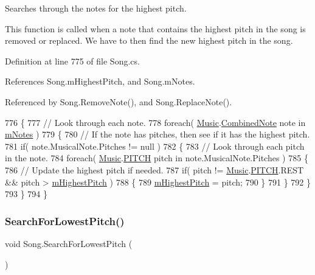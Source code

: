 Searches through the notes for the highest pitch. 

This function is called when a note that contains the highest pitch in the song is removed or replaced. We have to then find the new highest pitch in the song. 

Definition at line 775 of file Song.\+cs.



References Song.\+m\+Highest\+Pitch, and Song.\+m\+Notes.



Referenced by Song.\+Remove\+Note(), and Song.\+Replace\+Note().


\begin{DoxyCode}
776     \{
777         \textcolor{comment}{// Look through each note.}
778         \textcolor{keywordflow}{foreach}( \hyperlink{class_music}{Music}.\hyperlink{group___music_structs_struct_music_1_1_combined_note}{CombinedNote} note in \hyperlink{group___song_priv_var_ga674bc904a1f856d485d5fb7fe84bac85}{mNotes} )
779         \{
780             \textcolor{comment}{// If the note has pitches, then see if it has the highest pitch.}
781             \textcolor{keywordflow}{if}( note.MusicalNote.Pitches != null )
782             \{
783                 \textcolor{comment}{// Look through each pitch in the note.}
784                 \textcolor{keywordflow}{foreach}( \hyperlink{class_music}{Music}.\hyperlink{group___music_enums_ga508f69b199ea518f935486c990edac1d}{PITCH} pitch in note.MusicalNote.Pitches )
785                 \{
786                     \textcolor{comment}{// Update the highest pitch if needed.}
787                     \textcolor{keywordflow}{if}( pitch != \hyperlink{class_music}{Music}.\hyperlink{group___music_enums_ga508f69b199ea518f935486c990edac1d}{PITCH}.REST && pitch > 
      \hyperlink{group___song_priv_var_ga2dcd39d9add609e9df56a94057441dcc}{mHighestPitch} )
788                     \{
789                         \hyperlink{group___song_priv_var_ga2dcd39d9add609e9df56a94057441dcc}{mHighestPitch} = pitch;
790                     \}
791                 \}
792             \}
793         \}
794     \}
\end{DoxyCode}
\mbox{\label{group___song_priv_func_gac2e812c6385529eb7a9be5082c7bde75}} 
\subsubsection{\texorpdfstring{Search\+For\+Lowest\+Pitch()}{SearchForLowestPitch()}}
{\footnotesize\ttfamily void Song.\+Search\+For\+Lowest\+Pitch (\begin{DoxyParamCaption}{ }\end{DoxyParamCaption})\hspace{0.3cm}{\ttfamily [private]}}



